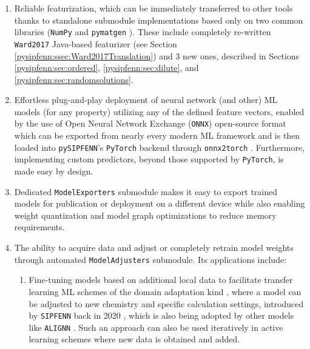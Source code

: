 \begin{enumerate}
    
    \item Reliable featurization, which can be immediately transferred to other tools thanks to standalone submodule implementations based only on two common libraries (\texttt{NumPy} \cite{Harris2020ArrayNumPy} and \texttt{pymatgen} \cite{Ong2013PythonAnalysis}). These include completely re-written \texttt{Ward2017} Java-based featurizer \cite{Ward2017} (see Section \ref{pysipfenn:ssec:Ward2017Translation}) and 3 new ones, described in Sections \ref{pysipfenn:sec:ordered}, \ref{pysipfenn:sec:dilute}, and \ref{pysipfenn:sec:randomsolutions}.

    \item Effortless plug-and-play deployment of neural network (and other) ML models (for any property) utilizing any of the defined feature vectors, enabled by the use of Open Neural Network Exchange (\texttt{ONNX}) open-source format \cite{Bai2019ONNX:Exchange} which can be exported from nearly every modern ML framework and is then loaded into \texttt{pySIPFENN}'s \texttt{PyTorch} backend \cite{Paszke2019PyTorch:Library} through \texttt{onnx2torch} \cite{Kalgin2021Onnx2torch:PyTorch}. Furthermore, implementing custom predictors, beyond those supported by \texttt{PyTorch}, is made easy by design.

    \item Dedicated \texttt{ModelExporters} submodule makes it easy to export trained models for publication or deployment on a different device while also enabling weight quantization and model graph optimizations to reduce memory requirements.

    \item The ability to acquire data and adjust or completely retrain model weights through automated \texttt{ModelAdjusters} submodule. Its applications include:
    \begin{enumerate}
        \item Fine-tuning models based on additional local data to facilitate transfer learning ML schemes of the domain adaptation kind \cite{Ben-David2010ADomains}, where a model can be adjusted to new chemistry and specific calculation settings, introduced by \texttt{SIPFENN} back in 2020 \cite{Krajewski2022ExtensibleNetworks}, which is also being adopted by other models like \texttt{ALIGNN} \cite{Gupta2024Structure-awareDatasets}. Such an approach can also be used iteratively in active learning schemes where new data is obtained and added.
        

\end{enumerate}
\end{enumerate}
